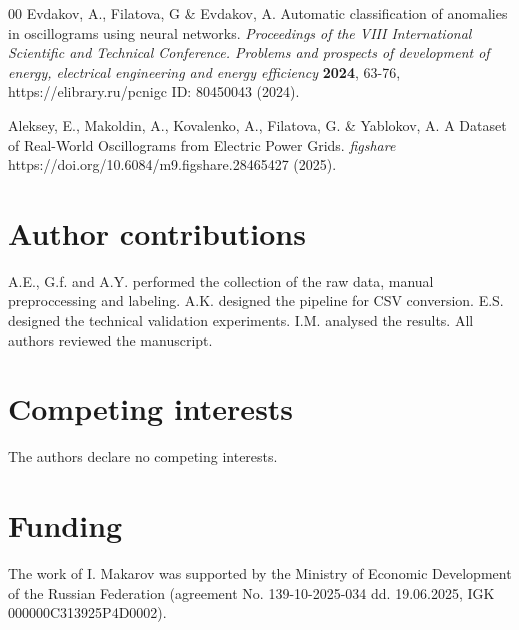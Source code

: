 \documentclass{article}
\begin{document}
\begin{thebibliography}{00}
 Evdakov, A., Filatova, G \& Evdakov, A. Automatic classification of anomalies in oscillograms using neural networks. \emph{Proceedings of the VIII International Scientific and Technical Conference. Problems and prospects of development of energy, electrical engineering and energy efficiency} \textbf{2024}, 63-76, https://elibrary.ru/pcnigc ID: 80450043 (2024).

 Aleksey, E., Makoldin, A., Kovalenko, A., Filatova, G. \& Yablokov, A. A Dataset of Real-World Oscillograms from Electric Power Grids. \emph{figshare} https://doi.org/10.6084/m9.figshare.28465427 (2025).

\end{thebibliography}

\section*{Author contributions}

A.E., G.f. and A.Y. performed the collection of the raw data, manual preproccessing and labeling. A.K. designed the pipeline for CSV conversion. E.S. designed the technical validation experiments. I.M. analysed the results. All authors reviewed the manuscript.

\section*{Competing interests}

The authors declare no competing interests.

\section*{Funding}

The work of I. Makarov was supported by the Ministry of Economic Development of the Russian Federation (agreement No. 139-10-2025-034 dd. 19.06.2025, IGK 000000C313925P4D0002).
\end{document}
